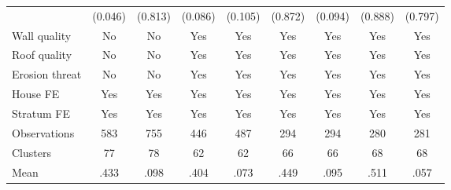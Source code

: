 {\begin{tabular}{l*{8}{c}}
                &  (0.046)         &  (0.813)         &  (0.086)         &  (0.105)         &  (0.872)         &  (0.094)         &  (0.888)         &  (0.797)         \\
Wall quality    &       No         &       No         &      Yes         &      Yes         &      Yes         &      Yes         &      Yes         &      Yes         \\
Roof quality    &       No         &       No         &      Yes         &      Yes         &      Yes         &      Yes         &      Yes         &      Yes         \\
Erosion threat  &       No         &       No         &      Yes         &      Yes         &      Yes         &      Yes         &      Yes         &      Yes         \\
House FE        &      Yes         &      Yes         &      Yes         &      Yes         &      Yes         &      Yes         &      Yes         &      Yes         \\
Stratum FE      &      Yes         &      Yes         &      Yes         &      Yes         &      Yes         &      Yes         &      Yes         &      Yes         \\
\hline
Observations    &      583         &      755         &      446         &      487         &      294         &      294         &      280         &      281         \\
Clusters        &       77         &       78         &       62         &       62         &       66         &       66         &       68         &       68         \\
Mean            &     .433         &     .098         &     .404         &     .073         &     .449         &     .095         &     .511         &     .057         \\
\hline\hline
\end{tabular}
}
